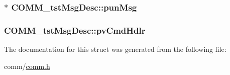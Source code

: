 \subsubsection[{pun\+Msg}]{$\ast$ C\+O\+M\+M\+\_\+tst\+Msg\+Desc\+::pun\+Msg}\label{struct_c_o_m_m__tst_msg_desc_ae9bd9271a76016a5c1ad83b30a0e1886}
\hypertarget{struct_c_o_m_m__tst_msg_desc_aa93ad2aeb6e15c4e1ba0a2c3697fbd61}{}
\subsubsection[{pv\+Cmd\+Hdlr}]{ C\+O\+M\+M\+\_\+tst\+Msg\+Desc\+::pv\+Cmd\+Hdlr}\label{struct_c_o_m_m__tst_msg_desc_aa93ad2aeb6e15c4e1ba0a2c3697fbd61}


The documentation for this struct was generated from the following file\+:\begin{DoxyCompactItemize}
\item 
comm/\hyperlink{comm_8h}{comm.\+h}\end{DoxyCompactItemize}

